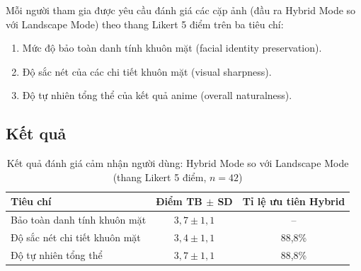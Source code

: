 Mỗi người tham gia được yêu cầu đánh giá các cặp ảnh (đầu ra Hybrid Mode so với Landscape Mode) theo thang Likert 5 điểm trên ba tiêu chí:
\begin{enumerate}
    \item Mức độ bảo toàn danh tính khuôn mặt (facial identity preservation).
    \item Độ sắc nét của các chi tiết khuôn mặt (visual sharpness).
    \item Độ tự nhiên tổng thể của kết quả anime (overall naturalness).
\end{enumerate}


\subsection{Kết quả}
\label{subsec:user_study_results}

\begin{table}[H]
\caption{Kết quả đánh giá cảm nhận người dùng: Hybrid Mode so với Landscape Mode (thang Likert 5 điểm, $n = 42$)}
\label{tab:user_study}
\centering
\begin{tabular}{|p{5cm}|c|c|}
\hline
\textbf{Tiêu chí} & \textbf{Điểm TB $\pm$ SD} & \textbf{Tỉ lệ ưu tiên Hybrid} \\
\hline
Bảo toàn danh tính khuôn mặt & $3{,}7 \pm 1{,}1$ & -- \\
\hline
Độ sắc nét chi tiết khuôn mặt & $3{,}4 \pm 1{,}1$ & 88,8\% \\
\hline
Độ tự nhiên tổng thể & $3{,}7 \pm 1{,}1$ & 88,8\% \\
\hline
\end{tabular}
\end{table}


